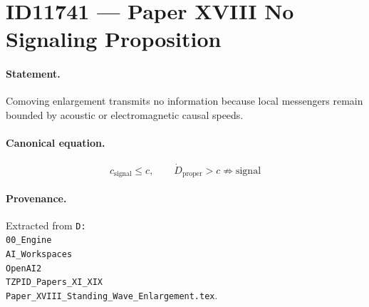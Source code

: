 \section*{ID11741 --- Paper XVIII No Signaling Proposition}

\paragraph{Statement.}
Comoving enlargement transmits no information because local messengers remain bounded by acoustic or electromagnetic causal speeds.

\paragraph{Canonical equation.}
\[
c_{\mathrm{signal}}\le c,\qquad \dot D_{\mathrm{proper}}>c\not\Rightarrow\text{signal}
\]

\paragraph{Provenance.}
Extracted from \texttt{D:\\00\_Engine\\AI\_Workspaces\\OpenAI2\\TZPID\_Papers\_XI\_XIX\\Paper\_XVIII\_Standing\_Wave\_Enlargement.tex}.
